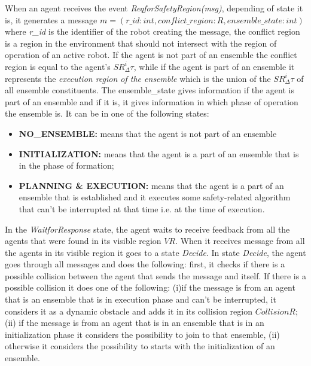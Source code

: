 \documentclass[journal]{IEEEtran}
\theoremstyle{definition}
\begin{document}
When an agent receives the event \textit{ReqforSafetyRegion(msg)}, depending of state it is, it generates a message  $m=(r\_id: int, conflict\_region: R, ensemble\_state: int)$ where \textit{r\_id} is the identifier of the robot creating the message, the conflict region is a region in the environment that should not intersect with the region of operation of an active robot. If the agent is not part of an ensemble the conflict region is equal to the agent's $SR^i_\Delta\tau$, while if the agent is part of an ensemble it represents the \textit{execution region of the ensemble} which is the union of the
$SR^i_\Delta\tau$ of all ensemble constituents. The ensemble\_state gives information if the agent is part of an ensemble and if it is, it gives information in which phase of operation the ensemble is. It can be in one of the following states: 
\begin{itemize}
\item \textbf{NO\_ENSEMBLE:} means that the agent is not part of an ensemble
\item \textbf{INITIALIZATION:}  means that the agent is a part of an ensemble that is in the phase of formation;
\item \textbf{PLANNING \& EXECUTION:}
means that the agent is a part of an ensemble that is established and it executes some safety-related algorithm that can't be interrupted at that time i.e. at the time of execution.
\end{itemize}


In the \textit{WaitforResponse} state, the agent waits to receive feedback from all the agents that were found in its visible region $VR$. When it receives message from all the agents in its visible region it goes to a state \textit{Decide}. In state \textit{Decide}, the agent goes through all messages and does the following: first, it checks if there is a possible collision between the agent that sends the message and itself.  
If there is a possible collision it does one of the following:
(i)if the message is from an agent that is an ensemble that is in execution phase and can't be interrupted, it considers it as a dynamic obstacle and adds it in its collision region $CollisionR$; (ii) if the message is from an agent that is in an ensemble that is in an initialization phase it considers the possibility to join to that ensemble, (ii) otherwise it considers the possibility to starts with the initialization of an ensemble.
\end{document}

